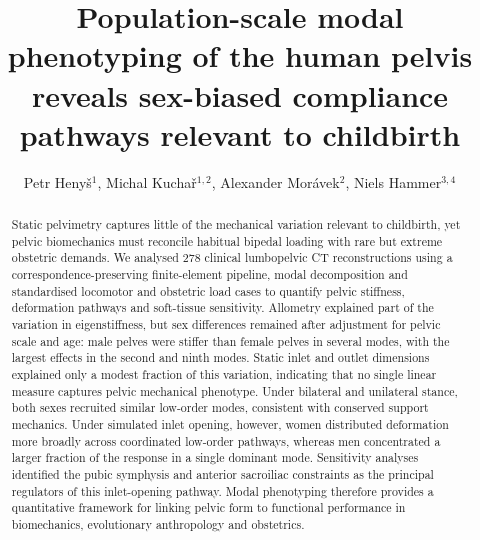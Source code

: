 \documentclass[openacc]{rsproca_new}
\begin{document}
\title{Population-scale modal phenotyping of the human pelvis reveals sex-biased compliance pathways relevant to childbirth}

\author{Petr Heny\v{s}$^{1}$, Michal Kucha\v{r}$^{1,2}$, Alexander Mor\'avek$^{2}$, Niels Hammer$^{3,4}$}

\address{$^{1}$Institute of New Technologies and Applied Informatics, Faculty of Mechatronics, Informatics and Interdisciplinary Studies, Technical University of Liberec, Liberec, Czech Republic\\
$^{2}$Department of Anatomy, Faculty of Medicine in Hradec Kr\'alov\'e, Charles University, Hradec Kr\'alov\'e, Czech Republic\\
$^{3}$Division of Macroscopic and Clinical Anatomy, Gottfried Schatz Research Center, Medical University of Graz, Graz, Austria\\
$^{4}$Division of Macroscopic and Clinical Anatomy, Gottfried Schatz Research Center, Medical University of Graz, Graz, Austria; Department of Orthopedic and Trauma Surgery, University of Leipzig, Leipzig, Germany; Division of Biomechatronics, Fraunhofer IWU, Dresden, Germany}

\subject{biomechanics, evolutionary anthropology, obstetrics}



\begin{abstract}
Static pelvimetry captures little of the mechanical variation relevant to childbirth, yet pelvic biomechanics must reconcile habitual bipedal loading with rare but extreme obstetric demands. We analysed 278 clinical lumbopelvic CT reconstructions using a correspondence-preserving finite-element pipeline, modal decomposition and standardised locomotor and obstetric load cases to quantify pelvic stiffness, deformation pathways and soft-tissue sensitivity. Allometry explained part of the variation in eigenstiffness, but sex differences remained after adjustment for pelvic scale and age: male pelves were stiffer than female pelves in several modes, with the largest effects in the second and ninth modes. Static inlet and outlet dimensions explained only a modest fraction of this variation, indicating that no single linear measure captures pelvic mechanical phenotype. Under bilateral and unilateral stance, both sexes recruited similar low-order modes, consistent with conserved support mechanics. Under simulated inlet opening, however, women distributed deformation more broadly across coordinated low-order pathways, whereas men concentrated a larger fraction of the response in a single dominant mode. Sensitivity analyses identified the pubic symphysis and anterior sacroiliac constraints as the principal regulators of this inlet-opening pathway. Modal phenotyping therefore provides a quantitative framework for linking pelvic form to functional performance in biomechanics, evolutionary anthropology and obstetrics.
\end{abstract}
\end{document}
